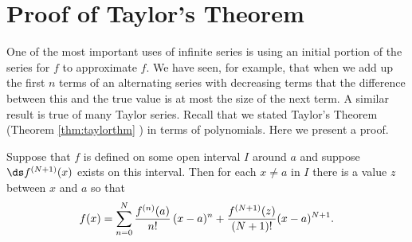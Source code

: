 \section{Proof of Taylor's Theorem}\label{sec:TaylorsTheorem}

One of the most important uses of infinite series is
using an initial portion of the series for $f$ to approximate $f$. We
have seen, for example, that when we add up the first $n$ terms of an
alternating series with decreasing terms that the difference between
this and the true value is at most the size of the next term. A
similar result is true of many Taylor series. Recall that we stated Taylor's Theorem (Theorem \ref{thm:taylorthm} ) in terms of polynomials. Here we present a proof.

\begin{theorem*}%
Suppose that $f$ is defined on some open interval $I$ around $a$ and
suppose $\ds f^{(N+1)}(x)$ exists on this interval. Then
for each $x\not=a$ in $I$ there is a value $z$ between
$x$ and $a$ so that
$$ 
  f(x) = \sum_{n=0}^N {f^{(n)}(a)\over n!}\,(x-a)^n + 
  {f^{(N+1)}(z)\over (N+1)!}(x-a)^{N+1}. 
$$ 
\end{theorem*}
